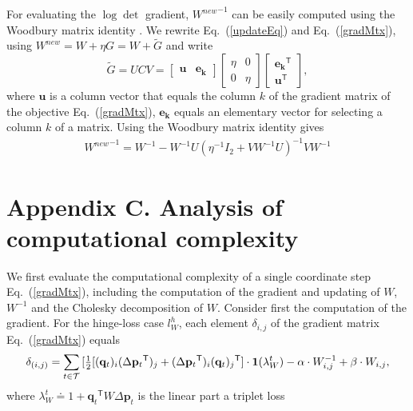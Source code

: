 \documentclass[twoside,11pt]{article}
\newcommand\mat[1]{{#1}}
\renewcommand\vec[1]{\mathbf{#1}}
\newcommand{\T}{{}^\mathsf{T}}
\newcommand{\W}{\mat{W}}
\newcommand{\newW}{{\mat{W^{new}}}}
\newcommand{\eqdef}{\doteq}
\newcommand{\q}{{\vec{q}}}
\newcommand{\p}{{\vec{p}}}
\newcommand{\trip}{{t}}
\newcommand{\qt}{{\q_{\trip}}}
\renewcommand{\eqref}[1]{Eq.~(\ref{#1})}
\begin{document}
For evaluating the $\log\det$ gradient, $\newW^{-1}$ can be easily computed using the Woodbury matrix
identity \citep{woodbury1950inverting}. We rewrite \eqref{updateEq} and \eqref{gradMtx}, using $\newW = \W + \eta G = \W+\mat{\widetilde{G}}$
and write
\begin{equation}
  \mat{\widetilde{G}} = \mat{U}\mat{C}\mat{V} = \left[ \begin{matrix}
      \vec{u} & \vec{e_k} \end{matrix} \right] \left[ \begin{matrix}
      \eta & 0 \\ 0 & \eta \end{matrix} \right] \left[ \begin{matrix}
      \vec{e_k}\T \\ \vec{u}\T \end{matrix} \right],
  \label{gradMtxWDB}
  \nonumber 
\end{equation}
where $\vec{u}$ is a column vector that equals the column $k$ of the gradient matrix of the objective \eqref{gradMtx},
$\vec{e_k}$ equals an elementary vector for selecting a column $k$ of
a matrix. 
Using the Woodbury matrix identity gives 
\begin{equation}
    \begin{array}{lcl}
    \newW^{-1} = 
    \W^{-1} - \W^{-1} \mat{U} (\eta^{-1} I_2 + \mat{V}     \W^{-1} \mat{U})^{-1} \mat{V} \W^{-1}
    \end{array}
    \nonumber
    \label{InvWwdb}
\end{equation}

 

\section*{Appendix C. Analysis of computational complexity}

We first evaluate the computational complexity of a single coordinate step \eqref{gradMtx}, including the computation of the gradient and updating of $\W$, $\W^{-1}$ and the Cholesky decomposition of $\W$. Consider first the computation of the gradient. For the hinge-loss case $l^{h}_W$, each element $\delta_{i,j}$ of the gradient matrix \eqref{gradMtx} equals
\begin{equation}
    \delta_{(i,j)} = \sum\limits_{t\in \cal{T}}{ [\tfrac{1}{2}[(\vec{q}_{t})_i(\Delta\vec{p}_{t}\T)_j + (\Delta\vec{p}_{t}\T)_i(\vec{q}_{t})_j\T] } \cdot \textbf{1}(\lambda_{W}^t) - \alpha \cdot \W^{-1}_{i,j} + \beta \cdot \W_{i,j},
\label{gradMatElem}
\end{equation}
where $\lambda_{W}^t \eqdef 1+\qt\T \W \Delta\p_{t}$ is the linear part a triplet loss
\end{document}
